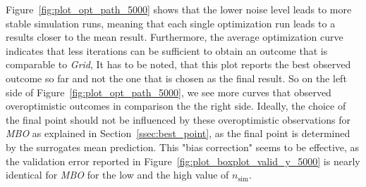 \documentclass[bimj,fleqn]{w-art}
\theoremstyle{plain}
\theoremstyle{definition}
\begin{document}
Figure~\ref{fig:plot_opt_path_5000} shows that the lower noise level leads to more stable simulation runs, meaning that each single optimization run leads to a results closer to the mean result.
Furthermore, the average optimization curve indicates that less iterations can be sufficient to obtain an outcome that is comparable to \emph{Grid},
It has to be noted, that this plot reports the best observed outcome so far and not the one that is chosen as the final result.
So on the left side of Figure~\ref{fig:plot_opt_path_5000}, we see more curves that observed overoptimistic outcomes in comparison the the right side.
Ideally, the choice of the final point should not be influenced by these overoptimistic observations for \emph{MBO} as explained in Section~\ref{ssec:best_point}, as the final point is determined by the surrogates mean prediction.
This "bias correction" seems to be effective, as the validation error reported in Figure~\ref{fig:plot_boxplot_valid_y_5000} is nearly identical for \emph{MBO} for the low and the high value of $n_\text{sim}$.
\end{document}
